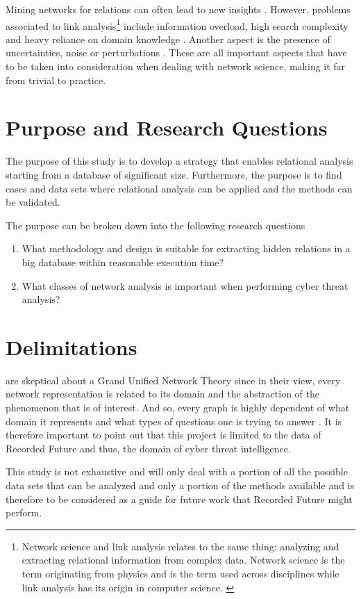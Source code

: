 Mining networks for relations can often lead to new insights \cite{hendrix2010}. However, problems associated to link analysis\footnote{Network science and link analysis relates to the same thing: analyzing and extracting relational information from complex data. Network science is the term originating from physics and is the term used across disciplines while link analysis has its origin in computer science. \cite{fouss2016algorithms}} include information overload, high search complexity and heavy reliance on domain knowledge \cite{hendrix2010,schroeder2007}. Another aspect is the presence of uncertainties, noise or perturbations \cite{hendrix2010}. These are all important aspects that have to be taken into consideration when dealing with network science, making it far from trivial to practice. 

\section{Purpose and Research Questions}

The purpose of this study is to develop a strategy that enables relational analysis starting from a database of significant size. Furthermore, the purpose is to find cases and data sets where relational analysis can be applied and the methods can be validated. 

The purpose can be broken down into the following research questions
\begin{enumerate}
    \item What methodology and design is suitable for extracting hidden relations in a big database within reasonable execution time?
    \item What classes of network analysis is important when performing cyber threat analysis?
\end{enumerate}

\section{Delimitations}
\citet{brandes2013} are skeptical about a Grand Unified Network Theory since in their view, every network representation is related to its domain and the abstraction of the phenomenon that is of interest. And so, every graph is highly dependent of what domain it represents and what types of questions one is trying to answer \cite{hendrix2010, schroeder2007}. It is therefore important to point out that this project is limited to the data of Recorded Future and thus, the domain of cyber threat intelligence. 

This study is not exhaustive and will only deal with a portion of all the possible data sets that can be analyzed and only a portion of the methods available and is therefore to be considered as a guide for future work that Recorded Future might perform.
